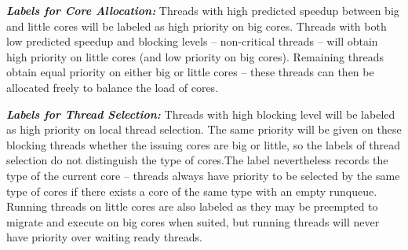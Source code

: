 \textbf{\textit{Labels for Core Allocation:}}
Threads with high predicted speedup between big and little cores will be labeled as high priority on big cores. Threads with both low predicted speedup and blocking levels -- non-critical threads -- will obtain high priority on little cores (and low priority on big cores). Remaining threads obtain equal priority on either big or little cores -- these threads can then be allocated freely to balance the load of cores.

\textbf{\textit{Labels for Thread Selection:}}
Threads with high blocking level will be labeled as high priority on local thread selection. The same priority will be given on these blocking threads whether the issuing cores are big or little, so the labels of thread selection do not distinguish the type of cores.The label nevertheless records the type of the current core -- threads always have priority to be selected by the same type of cores if there exists a core of the same type with an empty runqueue. Running threads on little cores are also labeled as they may be preempted to migrate and execute on big cores when suited, but running threads will never have priority over waiting ready threads. 





